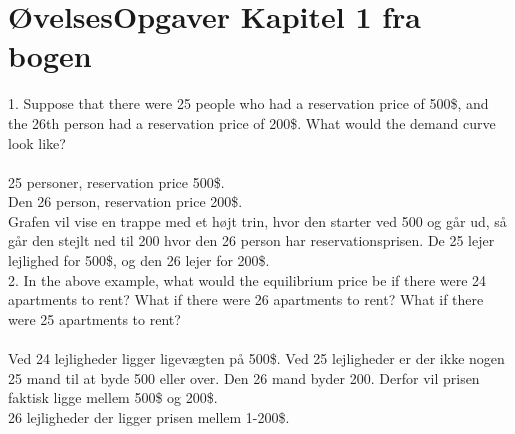 \documentclass{article}
\begin{document}
\newpage
\section*{ØvelsesOpgaver Kapitel 1 fra bogen}
1. Suppose that there were 25 people who had a reservation price of 500\$, and the 26th person had a reservation price of 200\$. What would the demand curve look like? \\ \\
25 personer, reservation price 500\$.  \\
Den 26 person, reservation price 200\$. \\
Grafen vil vise en trappe med et højt trin, hvor den starter ved 500 og går ud, så går den stejlt ned til 200 hvor den 26 person har reservationsprisen. De 25 lejer lejlighed for 500\$, og den 26 lejer for 200\$. \\ 

2. In the above example, what would the equilibrium price be if there were 24 apartments to rent? What if there were 26 apartments to rent? What if there were 25 apartments to rent? \\ \\
Ved 24 lejligheder ligger ligevægten på 500\$. Ved 25 lejligheder er der ikke nogen 25 mand til at byde 500 eller over. Den 26 mand byder 200. Derfor vil prisen faktisk ligge mellem 500\$ og 200\$. \\
26 lejligheder der ligger prisen mellem 1-200\$. \\
\end{document}
